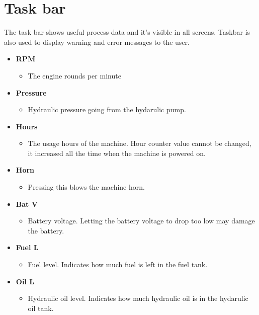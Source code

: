 \documentclass[12pt,a4paper,english]{uvmanual}
\begin{document}
\chapter{Task bar}\label{ch:taskbar}
The task bar shows useful process data and it's visible in all screens. Taskbar is also used to display warning and error messages to the user.


\begin{itemize}
 
 \item \textbf{RPM}
 \begin{itemize}
  \item The engine rounds per minute
 \end{itemize}

 \item \textbf{Pressure}
 \begin{itemize}
  \item Hydraulic pressure going from the hydarulic pump.
 \end{itemize}

 \item \textbf{Hours}
 \begin{itemize}
  \item The usage hours of the machine. Hour counter value cannot be changed, it increased all the time when the machine is powered on.
 \end{itemize}
 
 \item \textbf{Horn}
 \begin{itemize}
  \item Pressing this blows the machine horn.
 \end{itemize}
 
 \item \textbf{Bat V}
 \begin{itemize}
  \item Battery voltage. Letting the battery voltage to drop too low may damage the battery.
 \end{itemize}

 \item \textbf{Fuel L}
 \begin{itemize}
  \item Fuel level. Indicates how much fuel is left in the fuel tank.
 \end{itemize}

 \item \textbf{Oil L}
 \begin{itemize}
  \item Hydraulic oil level. Indicates how much hydraulic oil is in the hydarulic oil tank.
 \end{itemize}
 

\end{itemize}
\end{document}
